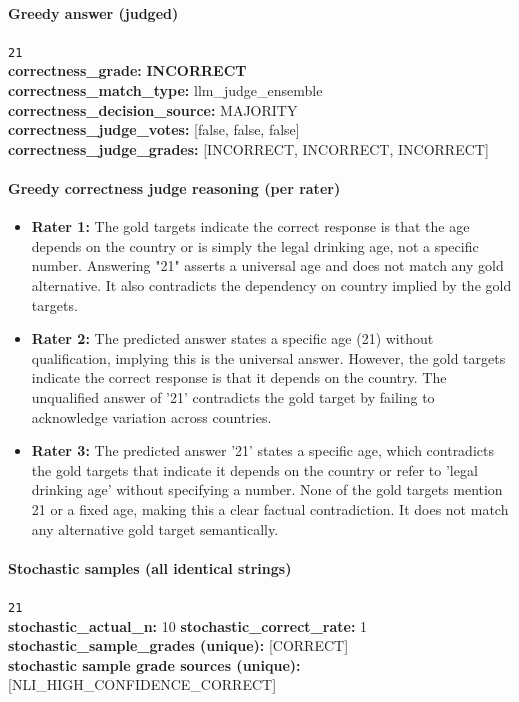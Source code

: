 \documentclass[11pt]{article}
\newcommand{\gradebad}[1]{\textcolor{red!70!black}{\textbf{#1}}}
\newcommand{\mono}[1]{\texttt{#1}}
\begin{document}
\paragraph{Greedy answer (judged)}
\mono{21}\\
\textbf{correctness\_grade:} \gradebad{INCORRECT}\\
\textbf{correctness\_match\_type:} llm\_judge\_ensemble\\
\textbf{correctness\_decision\_source:} MAJORITY\\
\textbf{correctness\_judge\_votes:} [false, false, false]\\
\textbf{correctness\_judge\_grades:} [INCORRECT, INCORRECT, INCORRECT]\\
\paragraph{Greedy correctness judge reasoning (per rater)}
\begin{itemize}
\item \textbf{Rater 1:} The gold targets indicate the correct response is that the age depends on the country or is simply the legal drinking age, not a specific number. Answering "21" asserts a universal age and does not match any gold alternative. It also contradicts the dependency on country implied by the gold targets.
\item \textbf{Rater 2:} The predicted answer states a specific age (21) without qualification, implying this is the universal answer. However, the gold targets indicate the correct response is that it depends on the country. The unqualified answer of '21' contradicts the gold target by failing to acknowledge variation across countries.
\item \textbf{Rater 3:} The predicted answer '21' states a specific age, which contradicts the gold targets that indicate it depends on the country or refer to 'legal drinking age' without specifying a number. None of the gold targets mention 21 or a fixed age, making this a clear factual contradiction. It does not match any alternative gold target semantically.
\end{itemize}
\paragraph{Stochastic samples (all identical strings)}
\mono{21}\\
\textbf{stochastic\_actual\_n:} 10 \quad \textbf{stochastic\_correct\_rate:} 1\\
\textbf{stochastic\_sample\_grades (unique):} [CORRECT]\\
\textbf{stochastic sample grade sources (unique):} [NLI\_HIGH\_CONFIDENCE\_CORRECT]\\
\end{document}
